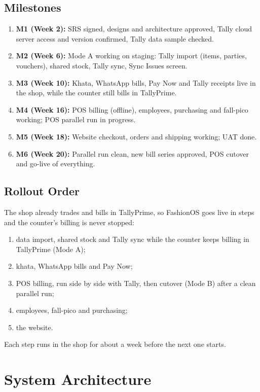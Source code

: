 \documentclass[11pt,a4paper]{article}
\begin{document}
\subsection{Milestones}
\begin{enumerate}
\item \textbf{M1 (Week 2):} SRS signed, designs and architecture approved, Tally cloud server access and version confirmed, Tally data sample checked.
\item \textbf{M2 (Week 6):} Mode A working on staging: Tally import (items, parties, vouchers), shared stock, Tally sync, Sync Issues screen.
\item \textbf{M3 (Week 10):} Khata, WhatsApp bills, Pay Now and Tally receipts live in the shop, while the counter still bills in TallyPrime.
\item \textbf{M4 (Week 16):} POS billing (offline), employees, purchasing and fall-pico working; POS parallel run in progress.
\item \textbf{M5 (Week 18):} Website checkout, orders and shipping working; UAT done.
\item \textbf{M6 (Week 20):} Parallel run clean, new bill series approved, POS cutover and go-live of everything.
\end{enumerate}

\subsection{Rollout Order}
The shop already trades and bills in TallyPrime, so FashionOS goes live in steps and the counter's billing is never stopped:
\begin{enumerate}
\item data import, shared stock and Tally sync while the counter keeps billing in TallyPrime (Mode A);
\item khata, WhatsApp bills and Pay Now;
\item POS billing, run side by side with Tally, then cutover (Mode B) after a clean parallel run;
\item employees, fall-pico and purchasing;
\item the website.
\end{enumerate}
Each step runs in the shop for about a week before the next one starts.

\section{System Architecture}
\end{document}
